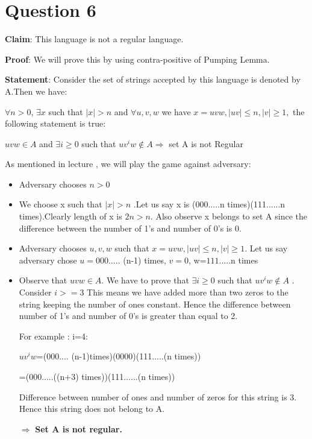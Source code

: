 \documentclass[12pt,a4paper]{article}
\begin{document}
\section {Question 6}

\textbf{Claim}: This language is not a regular language.

\textbf{Proof}: We will prove this by using contra-positive of Pumping Lemma.

\textbf{Statement}:
Consider the set of strings accepted by this language is denoted by A.Then we have:

$\forall n >0$, $\exists x$ such that $|x| > n$ and $\forall u,v,w $ we have $x=uvw , |uv| \leq n , |v| \geq 1, $ the following statement is true:

\begin{center}
    $uvw \in A$ and $\exists i \geq 0$ such that $uv^iw \notin A  \Rightarrow$ set A is not Regular 
\end{center}

As mentioned in lecture , we will play the game against adversary:

\begin{itemize}
    \item  Adversary chooses $n > 0$
    \item We choose x such that $|x| > n$
    .Let us say x is (000.....n  times)(111......n times).Clearly length of x is $2n > n$. Also observe x belongs to set A since the difference between the number of 1's and number of 0's is 0.
    \item Adversary chooses $u,v,w$ such that $x = uvw , |uv| \leq n , |v| \geq 1$.
    Let us say adversary chose $u= 000.....$ (n-1) times, $v=0$, w=$111.....$n times 
    \item Observe that $uvw \in A$.  We have to prove that $\exists i \geq 0 $ such that $uv^iw \notin A$  . Consider $i>=3$ This means we have added more than two zeros to the string keeping the number of ones constant. Hence the difference between number of 1's and number of 0's is greater than equal to 2.
    
    For example : i=4:
    
    $uv^iw$=(000.... (n-1)times)(0000)(111.....(n times))
    
    =(000.....((n+3) times))(111......(n times))
    
    Difference between number of ones and number of zeros for this string is 3. Hence this string does not belong to A.
    \begin{center}
       $\Rightarrow$ \textbf{Set A is not regular.} 
    \end{center}
\end{itemize}
\end{document}
